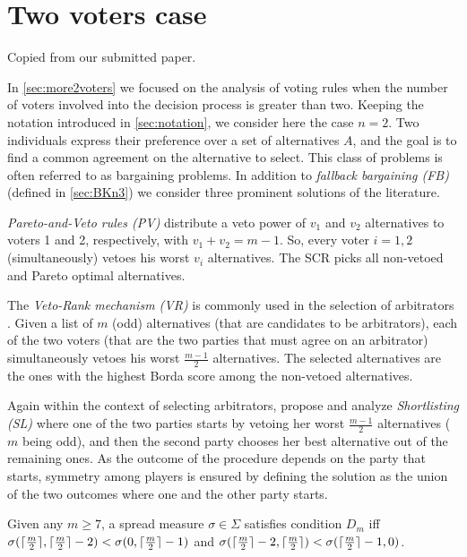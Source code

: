 \documentclass[pagesize, twoside=off, bibliography=totoc, DIV=calc, fontsize=12pt, a4paper]{scrartcl}
\begin{document}
\section{Two voters case}
Copied from our submitted paper.

In \cref{sec:more2voters} we focused on the analysis of voting rules when the number of voters involved into the decision process is greater than two. Keeping the notation introduced in \cref{sec:notation}, we consider here the case $n=2$. Two individuals express their preference over a set of alternatives $A$, and the goal is to find a common agreement on the alternative to select. This class of problems is often referred to as bargaining problems. In addition to \textit{fallback bargaining (FB)} \citep{Brams2001} (defined in \cref{sec:BKn3}) we consider three prominent solutions of the literature.

\textit{Pareto-and-Veto rules (PV)} \citep{Laslier2020} distribute a veto power of $v_1$ and $v_2$ alternatives to voters 1 and 2, respectively, with $v_1+v_2=m-1$. So, every voter $i=1,2$ (simultaneously) vetoes his worst $v_i$ alternatives. The \ac{SCR} picks all non-vetoed and Pareto optimal alternatives.

The \textit{Veto-Rank mechanism (VR)} is commonly used in the selection of arbitrators \citep{Clippel2014}. Given a list of $m$ (odd) alternatives (that are candidates to be arbitrators), each of the two voters (that are the two parties that must agree on an arbitrator) simultaneously vetoes his worst $\frac{m-1}{2}$ alternatives. The selected alternatives are the ones with the highest Borda score among the non-vetoed alternatives.

Again within the context of selecting arbitrators, \citet{Clippel2014} propose and analyze \textit{Shortlisting (SL)} where one of the two parties starts by vetoing her worst $\frac{m-1}{2}$ alternatives ($m$ being odd), and then the second party chooses her best alternative out of the remaining ones. As the outcome of the procedure depends on the party that starts, symmetry among players is ensured by defining the solution as the union of the two outcomes where one and the other party starts.

\begin{definition}
	Given any $m \geq 7$, a spread measure $\sigma \in \Sigma$ satisfies condition $D_m$ iff 
	$\sigma(\lceil\frac{m}{2}\rceil, \lceil\frac{m}{2}\rceil - 2) < \sigma(0, \lceil\frac{m}{2}\rceil - 1)$ and 
	$\sigma(\lceil\frac{m}{2}\rceil - 2, \lceil\frac{m}{2}\rceil) < \sigma(\lceil\frac{m}{2}\rceil - 1, 0)$.
\end{definition}
\end{document}
